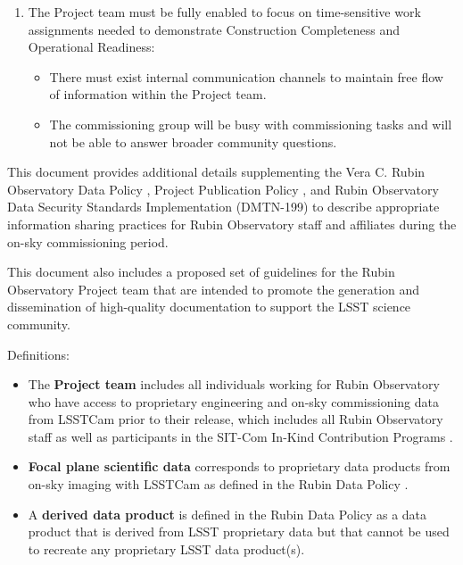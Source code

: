 \documentclass[SE,authoryear,toc,lsstdraft]{lsstdoc}
\begin{document}
\begin{enumerate}
  \item The Project team must be fully enabled to focus on time-sensitive work assignments needed to demonstrate Construction Completeness and Operational Readiness:

  \begin{itemize}

    \item There must exist internal communication channels to maintain free flow of information within the Project team.

    \item The commissioning group will be busy with commissioning tasks and will not be able to answer broader community questions.

  \end{itemize}

\end{enumerate}

This document provides additional details supplementing the Vera C. Rubin Observatory Data Policy , Project Publication Policy , and Rubin Observatory Data Security Standards Implementation (DMTN-199) to describe appropriate information sharing practices for Rubin Observatory staff and affiliates during the on-sky commissioning period.

This document also includes a proposed set of guidelines for the Rubin Observatory Project team that are intended to promote the generation and dissemination of high-quality documentation to support the LSST science community.

Definitions:

\begin{itemize}

  \item The \textbf{Project team} includes all individuals working for Rubin Observatory who have access to proprietary engineering and on-sky commissioning data from LSSTCam prior to their release, which includes all Rubin Observatory staff as well as participants in the SIT-Com In-Kind Contribution Programs .

  \item \textbf{Focal plane scientific data} corresponds to proprietary data products from on-sky imaging with LSSTCam as defined in the Rubin Data Policy .

  \item A \textbf{derived data product} is defined in the Rubin Data Policy  as a data product that is derived from LSST proprietary data but that cannot be used to recreate any proprietary LSST data product(s).


\end{itemize}
\end{document}
